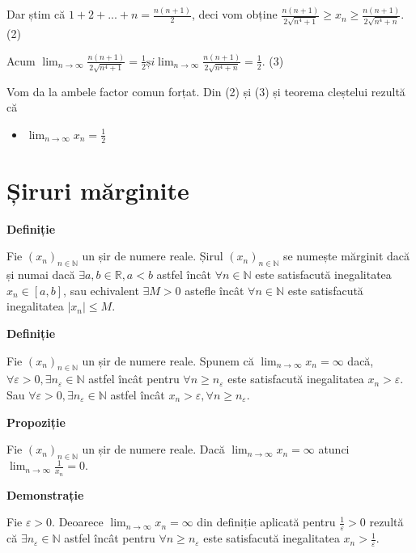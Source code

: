 \documentclass[a4paper,12pt,oneside]{report}
\begin{document}
Dar știm că \(1+2+...+n = \frac{n(n+1)}{2}\), deci vom obține \(\frac{n(n+1)}{2\sqrt{n^{4}+1}}\geq x_{n}\geq \frac{n(n+1)}{2\sqrt{n^{4}+n}}\). (2)

Acum 
\(\lim_{n \to \infty }\frac{n(n+1)}{2\sqrt{n^{4}+1}}=\frac{1}{2} și \lim_{n \to \infty }\frac{n(n+1)}{2\sqrt{n^{4}+n}}=\frac{1}{2}\). (3)

Vom da la ambele factor comun forțat. Din (2) și (3) și teorema cleștelui rezultă că
\begin{itemize}
  \item \(\lim_{n \to \infty }x_{n}=\frac{1}{2}\)
\end{itemize}

\section{Șiruri mărginite}

\textbf{Definiție}

Fie \((x_{n})_{n\in \mathbb{N}}\) un șir de numere reale. Șirul \((x_{n})_{n\in \mathbb{N}}\) se numește mărginit dacă și numai dacă \(\exists  a, b \in \mathbb{R}, a< b\) astfel încât \(\forall n\in \mathbb{N}\) este satisfacută inegalitatea \(x_{n}\in \left [ a,b \right ]\), sau echivalent \(\exists M> 0\) astefle încât \(\forall  n\in \mathbb{N}\) este satisfacută inegalitatea \(\left | x_{n} \right |\leq M\).

\textbf{Definiție }

Fie \((x_{n})_{n\in \mathbb{N}}\) un șir de numere reale. Spunem că \(\lim_{n \to \infty }x_{n}=\infty\) dacă, \(\forall \varepsilon > 0,\exists n_{\varepsilon }\in \mathbb{N}\) astfel încât pentru \(\forall n\geq n_{\varepsilon }\) este satisfacută inegalitatea \(x_{n}> \varepsilon\). 
Sau \(\forall \varepsilon > 0,\exists n_{\varepsilon }\in \mathbb{N}\) astfel încât \(x_{n}> \varepsilon ,\forall n\geq n_{\varepsilon }\). 

\textbf{Propoziție}
 
Fie \((x_{n})_{n\in \mathbb{N}}\) un șir de numere reale. Dacă \(\lim_{n \to \infty }x_{n}=\infty\) atunci\( \lim_{n \to \infty }\frac{1}{x_{n}}=0.\) 

\textbf{Demonstrație} 

Fie \(\varepsilon > 0\). Deoarece \(\lim_{n \to \infty }x_{n}=\infty\) din definiție aplicată pentru \(\frac{1}{\varepsilon }> 0\) rezultă că \(\exists n_{\varepsilon }\in \mathbb{N}\) astfel încât pentru \(\forall n\geq n_{\varepsilon }\) este satisfacută inegalitatea \(x_{n}> \frac{1}{\varepsilon }\). 
\end{document}
